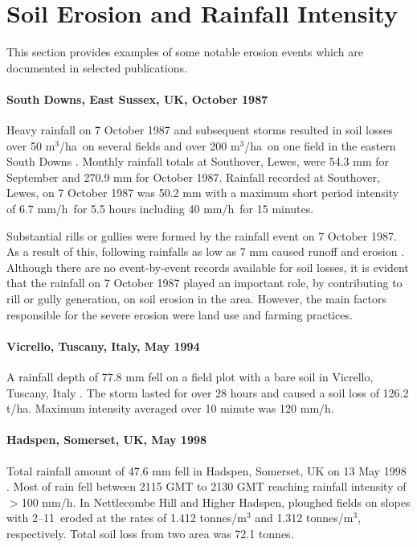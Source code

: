 \section{Soil Erosion and Rainfall Intensity}
\label{sec:RainfallIntensityAndSoilErosion}

This section provides examples of some notable erosion events which are
documented in selected publications.

\paragraph{South Downs, East Sussex, UK, October 1987
\citep{boardman1988-333}}
\label{sec:SouthDownsOctober1987}

Heavy rainfall on 7 October 1987 and subsequent storms resulted in soil losses
over 50 m$^3$/ha\ on several fields and over 200 m$^3$/ha\ on one field in the
eastern South Downs \citep{boardman1988-333}. Monthly rainfall totals at
Southover, Lewes, were 54.3 mm for September and 270.9 mm for October 1987.
Rainfall recorded at Southover, Lewes, on 7 October 1987 was 50.2 mm with a
maximum short period intensity of 6.7 mm/h\ for 5.5 hours including 40 mm/h\ for
15 minutes.

Substantial rills or gullies were formed by the rainfall event on 7 October
1987. As a result of this, following rainfalls as low as 7 mm caused runoff and
erosion \citep{boardman1988-333}.
Although there are no event-by-event records available for soil losses, it is
evident that the rainfall on 7 October 1987 played an important role, by
contributing to rill or gully generation, on  soil erosion in the area. However,
the main factors responsible for the severe erosion were land use and farming
practices.

\paragraph{Vicrello, Tuscany, Italy, May 1994 \citep{torri1999-131}}
\label{sec:VicrelloVolterraTuscany}

A rainfall depth of 77.8 mm fell on a field plot with a bare soil in Vicrello,
Tuscany, Italy \citep{torri1999-131}. The storm lasted for over 28 hours and
caused a soil loss of 126.2 t/ha. Maximum intensity averaged over 10 minute was
120 mm/h.

\paragraph{Hadspen, Somerset, UK, May 1998 \citep{clark2000-17}}
\label{sec:HadspenSomersetUK}
Total rainfall amount of 47.6 mm fell in Hadspen, Somerset, UK on 13 May 1998
\citep{clark2000-17}. Most of rain fell between 2115 GMT to 2130 GMT reaching
rainfall intensity of $>$100 mm/h. In Nettlecombe Hill and Higher Hadspen,
ploughed fields on slopes with 2--11\textdegree\ eroded at the rates of 1.412
tonnes/m$^3$ and 1.312 tonnes/m$^3$, respectively. Total soil loss from two area
was 72.1 tonnes.


